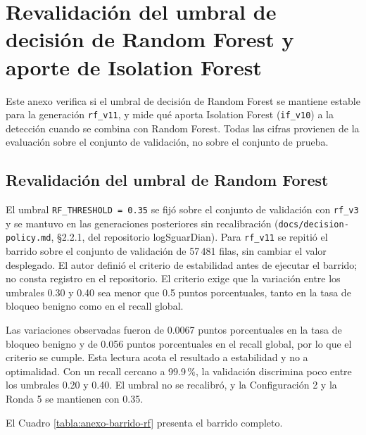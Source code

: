 \section{Revalidación del umbral de decisión de Random Forest y aporte de Isolation Forest}\label{anexo:revalidacion-umbral}

Este anexo verifica si el umbral de decisión de Random Forest se mantiene estable para la generación \texttt{rf\_v11}, y mide qué aporta Isolation Forest (\texttt{if\_v10}) a la detección cuando se combina con Random Forest. Todas las cifras provienen de la evaluación sobre el conjunto de validación, no sobre el conjunto de prueba.

\subsection{Revalidación del umbral de Random Forest}

El umbral \texttt{RF\_THRESHOLD = 0.35} se fijó sobre el conjunto de validación con \texttt{rf\_v3} y se mantuvo en las generaciones posteriores sin recalibración (\texttt{docs/decision-policy.md}, §2.2.1, del repositorio logSguarDian). Para \texttt{rf\_v11} se repitió el barrido sobre el conjunto de validación de 57\,481 filas, sin cambiar el valor desplegado. El autor definió el criterio de estabilidad antes de ejecutar el barrido; no consta registro en el repositorio. El criterio exige que la variación entre los umbrales 0.30 y 0.40 sea menor que 0.5 puntos porcentuales, tanto en la tasa de bloqueo benigno como en el recall global.

Las variaciones observadas fueron de 0.0067 puntos porcentuales en la tasa de bloqueo benigno y de 0.056 puntos porcentuales en el recall global, por lo que el criterio se cumple. Esta lectura acota el resultado a estabilidad y no a optimalidad. Con un recall cercano a 99.9\,\%, la validación discrimina poco entre los umbrales 0.20 y 0.40. El umbral no se recalibró, y la Configuración 2 y la Ronda 5 se mantienen con 0.35.

El Cuadro \ref{tabla:anexo-barrido-rf} presenta el barrido completo.

